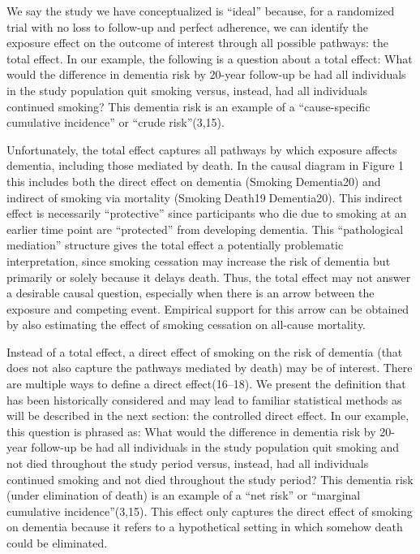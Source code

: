 \documentclass[
]{book}
\begin{document}
We say the study we have conceptualized is ``ideal'' because, for a randomized trial with no loss to follow-up and perfect adherence, we can identify the exposure effect on the outcome of interest through all possible pathways: the total effect. In our example, the following is a question about a total effect: What would the difference in dementia risk by 20-year follow-up be had all individuals in the study population quit smoking versus, instead, had all individuals continued smoking? This dementia risk is an example of a ``cause-specific cumulative incidence'' or ``crude risk''(3,15).

Unfortunately, the total effect captures all pathways by which exposure affects dementia, including those mediated by death. In the causal diagram in Figure 1 this includes both the direct effect on dementia (SmokingDementia20) and indirect of smoking via mortality (SmokingDeath19Dementia20). This indirect effect is necessarily ``protective'' since participants who die due to smoking at an earlier time point are ``protected'' from developing dementia. This ``pathological mediation'' structure gives the total effect a potentially problematic interpretation, since smoking cessation may increase the risk of dementia but primarily or solely because it delays death. Thus, the total effect may not answer a desirable causal question, especially when there is an arrow between the exposure and competing event. Empirical support for this arrow can be obtained by also estimating the effect of smoking cessation on all-cause mortality.

Instead of a total effect, a direct effect of smoking on the risk of dementia (that does not also capture the pathways mediated by death) may be of interest. There are multiple ways to define a direct effect(16--18). We present the definition that has been historically considered and may lead to familiar statistical methods as will be described in the next section: the controlled direct effect. In our example, this question is phrased as: What would the difference in dementia risk by 20-year follow-up be had all individuals in the study population quit smoking and not died throughout the study period versus, instead, had all individuals continued smoking and not died throughout the study period? This dementia risk (under elimination of death) is an example of a ``net risk'' or ``marginal cumulative incidence''(3,15). This effect only captures the direct effect of smoking on dementia because it refers to a hypothetical setting in which somehow death could be eliminated.
\end{document}
